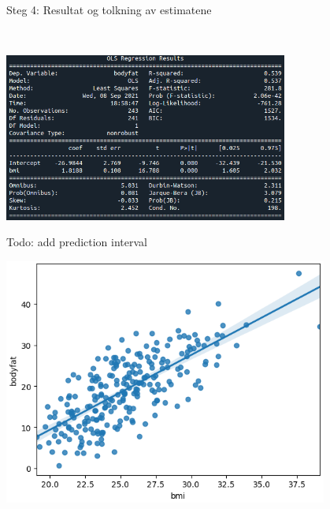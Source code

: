 \documentclass[10pt,ignorenonframetext,]{beamer}
\begin{document}
\begin{frame}

\begin{block}{Steg 4: Resultat og tolkning av estimatene}

\(~\)

\includegraphics[width=0.7\textwidth,height=\textheight]{ols_result.png}

\end{block}

\end{frame}

\begin{frame}

Todo: add prediction interval

\includegraphics[width=0.8\textwidth,height=\textheight]{ols_result_plot.png}

\end{frame}
\end{document}
